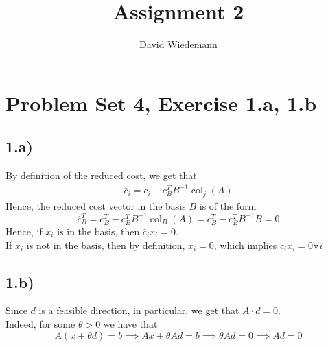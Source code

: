 \documentclass[11pt, a4paper]{article}
\DeclareMathOperator{\col}{col}
\begin{document}
\title{Assignment 2}
\author{David Wiedemann}
\maketitle
\section*{Problem Set 4, Exercise 1.a, 1.b}
\subsection*{1.a)}
By definition of the reduced cost, we get that
\begin{align*}
\overline{c}_i = c_i - c_B^{T}	B^{-1} \col_j( A) 
\end{align*}
Hence, the reduced cost vector in the basis $B$  is of the form
\[ 
\overline{c}_B^{T} = c_B^{T}- c_B^{T}B^{-1} \col_B( A) = c_B^{T}-c_B^{T}B^{-1}B = 0
\]
Hence, if $x_i$ is in the basis, then $\overline{c}_i x_i = 0$.\\
If $x_i$ is not in the basis, then by definition, $x_i=0$, which implies $\overline{c}_i x_i = 0 \forall i$ 

\subsection*{1.b)}
Since $d$ is a feasible direction, in particular, we get that $A\cdot d =0$.\\
Indeed, for some $\theta >0$ we have that
\[ 
A ( x+ \theta d) =b \implies Ax + \theta A d = b \implies \theta Ad = 0 \implies Ad = 0
\]
\end{document}
